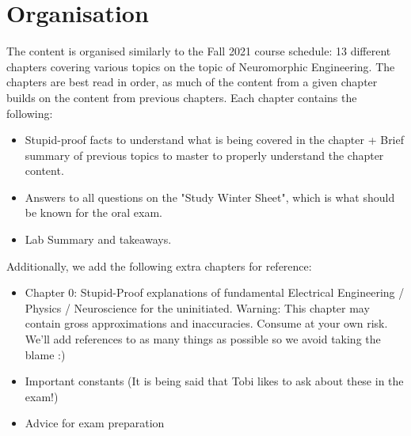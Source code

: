 \documentclass[main]{subfiles}
\begin{document}
\section*{Organisation}
The content is organised similarly to the Fall 2021 course schedule: 13 different chapters covering various topics on the topic of Neuromorphic Engineering. The chapters are best
read in order, as much of the content from a given chapter builds on the content from previous chapters. 
Each chapter contains the following: 
\begin{itemize}
  \item Stupid-proof facts to understand what is being covered in the chapter + Brief summary of previous topics to master to properly understand the chapter content.
  \item Answers to all questions on the "Study Winter Sheet", which is what should be known for the oral exam.
  \item Lab Summary and takeaways.
\end{itemize}
Additionally, we add the following extra chapters for reference: 
\begin{itemize}
    \item Chapter 0: Stupid-Proof explanations of fundamental Electrical Engineering / Physics / Neuroscience for the uninitiated. Warning: This chapter may contain gross approximations and inaccuracies. Consume at your own risk. We'll add references to as many things as possible so we avoid taking the blame :)
    \item Important constants (It is being said that Tobi likes to ask about these in the exam!) 
    \item Advice for exam preparation
\end{itemize}
\end{document}
